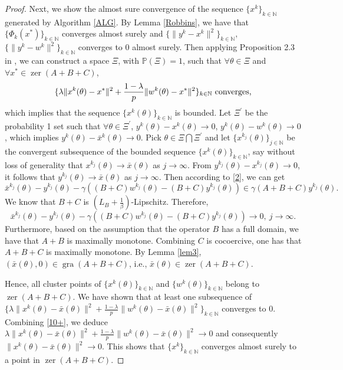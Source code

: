 \documentclass[a4paper,12pt]{article}
\theoremstyle{definition}
\DeclareMathOperator*{\zer}{zer}
\DeclareMathOperator*{\gra}{gra}
\begin{document}
\begin{proof}
Next, we show the almost sure convergence of the sequence $\{x^{k}\}_{k \in \mathbb{N}}$ generated by Algorithm \ref{ALG}.
By Lemma \ref{Robbins}, we have that $\{\Phi_{k}(x^*)\}_{k\in \mathbb{N}}$ converges almost surely and $\{\|y^k-x^k\|^2\}_{k\in \mathbb{N}},$ $\{ \|y^k-w^k\|^2\}_{k\in \mathbb{N}}$ converges to $0$ almost surely.
Then applying Proposition 2.3 in \cite{Comettes}, we can construct a space $\Xi$, with $\mathbb{P}(\Xi)=1$, such that $\forall  \theta \in \Xi$ and  $\forall x^* \in \zer(A+B+C)$,
\begin{equation}
\label{10+}
 \{\lambda \|x^k(\theta)-x^*\|^2+\frac{1-\lambda}{p}\|w^k(\theta)-x^*\|^2\}_{k\in \mathbb{N}} \ \hbox{converges,}
\end{equation}
which implies that the sequence $\{x^{k}(\theta)\}_{k \in \mathbb{N}}$ is bounded. Let $\Xi^{'}$ be the probability 1 set such that $ \forall \theta \in \Xi^{'}$, $y^k(\theta)-x^k(\theta) \rightarrow 0$, $y^k(\theta)-w^k(\theta) \rightarrow 0$,  which implies $y^k(\theta)-\bar{x}^k(\theta) \rightarrow 0$.
Pick $\theta \in \Xi \bigcap \Xi^{'}$ and let $\{x^{k_j}(\theta)\}_{j \in \mathbb{N}}$ be the convergent subsequence of the bounded sequence $\{x^{k}(\theta)\}_{k \in \mathbb{N}}$, say without loss of generality that $x^{k_j}(\theta) \rightarrow \bar{x}(\theta)$ as $j\rightarrow \infty$.  From  $y^{k_j}(\theta)-x^{k_j}(\theta) \rightarrow 0$, it follows that $y^{k_j}(\theta) \rightarrow \bar{x}(\theta)$ as $j\rightarrow \infty$.
Then according to \eqref{2}, we can get
\begin{equation*}
\bar{x}^{k_j}(\theta)-y^{k_j}(\theta)-\gamma((B+C)w^{k_j}(\theta)-(B+C)y^{k_j}(\theta))\in \gamma(A+B+C)y^{k_j}(\theta).
\end{equation*}
We know that $B+C$ is $(L_B+\frac{1}{\beta})$-Lipschitz. Therefore,
\begin{equation*}
\bar{x}^{k_j}(\theta)-y^{k_j}(\theta)-\gamma((B+C)w^{k_j}(\theta)-(B+C)y^{k_j}(\theta)) \rightarrow 0,\ j\rightarrow \infty.
\end{equation*}
Furthermore, based on the assumption that the operator $B$ has a full domain, we have that $A+B$ is maximally monotone. Combining $C$ is cocoercive, one has that $A+B+C$ is maximally monotone. By Lemma \ref{lem3}, $(\bar{x}(\theta) , 0) \in \gra(A+B+C)$, i.e., $\bar{x}(\theta) \in \zer(A+B+C)$.

Hence, all cluster points of $\{x^{k}(\theta)\}_{k \in \mathbb{N}}$ and $\{w^{k}(\theta)\}_{k \in \mathbb{N}}$ belong to $\zer(A+B+C)$. We have shown that at least  one subsequence of $\{\lambda \|x^k(\theta)-\bar{x}(\theta)\|^2+\frac{1-\lambda}{p}\|w^k(\theta)-\bar{x}(\theta)\|^2\}_{k \in \mathbb{N}}$ converges to $0$. Combining \eqref{10+}, we deduce $\lambda \|x^k(\theta)-\bar{x}(\theta)\|^2+\frac{1-\lambda}{p}\|w^k(\theta)-\bar{x}(\theta)\|^2 \rightarrow 0$ and consequently $\|x^k(\theta)-\bar{x}(\theta)\|^2 \rightarrow 0$. This shows that $\{x^k\}_{k \in \mathbb{N}}$ converges almost surely to a point in $\zer(A+B+C)$.
\end{proof}
\end{document}
